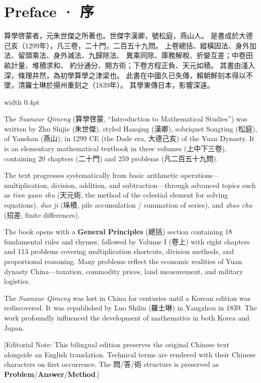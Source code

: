 \documentclass[10pt,a4paper]{article}
\newlength{\cnwidth}
\newlength{\enwidth}
\newcommand{\bilingual}[2]{%
  \noindent%
  \begin{minipage}[t]{\cnwidth}%
    #1%
  \end{minipage}%
  \hfill\vrule width 0.4pt\hfill%
  \begin{minipage}[t]{\enwidth}%
    #2%
  \end{minipage}%
  \par\smallskip%
}
\newcommand{\bilingualsection}[2]{%
  \section*{#1 · #2}
  \addcontentsline{toc}{section}{#1 · #2}
}
\newcommand{\transnote}[1]{%
  \par\smallskip\noindent\textcolor{notecolor}{\small[Editorial Note: #1]}\par\smallskip
}
\begin{document}
\tableofcontents
\newpage


\bilingualsection{Preface}{序}

\bilingual{%
  算學啓蒙者，元朱世傑之所著也。世傑字漢卿，號松庭，燕山人。
  是書成於大德己亥（1299年），凡三卷，二十門，二百五十九問。
  上卷總括、縱橫因法、身外加法、留頭乘法、身外減法、九歸除法、
  異乘同除、庫務解稅、折變互差；中卷田畝計量、堆積求和、
  約分通分、開方術；下卷方程正負、天元如積。
  其書由淺入深，條理井然，為初學算學之津梁也。
  此書在中國久已失傳，賴朝鮮刻本得以不墜，清羅士琳於揚州重刻之（1839年）。
  其學東傳日本，影響深遠。
}{%
  The \textit{Suanxue Qimeng} (算學啓蒙, ``Introduction to Mathematical Studies'')
  was written by Zhu Shijie (朱世傑), styled Hanqing (漢卿), sobriquet Songting
  (松庭), of Yanshan (燕山), in 1299 CE (the Dade era, 大德己亥) of the Yuan Dynasty.
  It is an elementary mathematical textbook in three volumes (上中下三卷), containing
  20 chapters (二十門) and 259 problems (凡二百五十九問).

  The text progresses systematically from basic arithmetic operations---multiplication,
  division, addition, and subtraction---through advanced topics such as \textit{tian yuan shu}
  (天元術, the method of the celestial element for solving equations), \textit{duo ji}
  (垛積, pile accumulation / summation of series), and \textit{zhao cha} (招差, finite
  differences).

  The book opens with a \textbf{General Principles} (總括) section containing 18
  fundamental rules and rhymes, followed by Volume I (卷上) with eight chapters
  and 113 problems covering multiplication shortcuts, division methods, and
  proportional reasoning. Many problems reflect the economic realities of Yuan
  dynasty China---taxation, commodity prices, land measurement, and military logistics.

  The \textit{Suanxue Qimeng} was lost in China for centuries until a Korean edition
  was rediscovered. It was republished by Luo Shilin (羅士琳) in Yangzhou in 1839.
  The work profoundly influenced the development of mathematics in both Korea and
  Japan.
}

\transnote{This bilingual edition preserves the original Chinese text alongside
an English translation. Technical terms are rendered with their Chinese
characters on first occurrence. The 問/答/術 structure is preserved as
\textbf{Problem}/\textbf{Answer}/\textbf{Method}.}
\end{document}
